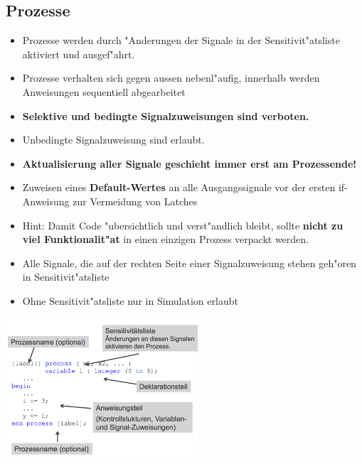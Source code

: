 	\subsection{Prozesse}
		\begin{multicols}{2}
			\begin{itemize}
			  \setlength{\itemsep}{1pt}
  			  \setlength{\parskip}{0pt}
  			  \setlength{\parsep}{0pt}
				\item Prozesse werden durch "Anderungen der Signale in der 	
					Sensitivit"atsliste aktiviert und ausgef"ahrt.
				\item Prozesse verhalten sich gegen aussen nebenl"aufig, innerhalb werden 
					Anweisungen sequentiell abgearbeitet
				\item \textbf{Selektive und bedingte Signalzuweisungen sind verboten.}
				\item Unbedingte Signalzuweisung sind erlaubt. 
				\item \textbf{Aktualisierung aller Signale geschieht immer erst am 
					Prozessende!}
				\item Zuweisen eines \textbf{Default-Wertes} an alle Ausgangssignale vor 	
					der ersten if-Anweisung zur Vermeidung von Latches 
				\item Hint: Damit Code "ubersichtlich und verst"andlich bleibt, sollte 	
					\textbf{nicht zu viel Funktionalit"at} in einen einzigen Prozess verpackt 
					werden.
				\item Alle Signale, die auf der rechten Seite einer Signalzuweisung stehen 	
					geh"oren in Sensitivit"atsliste 
				\item Ohne Sensitivit"atsliste nur in Simulation erlaubt
			\end{itemize}
			\includegraphics[width=0.535\textwidth]{pics/syntaxprozess}
		\end{multicols}
		
